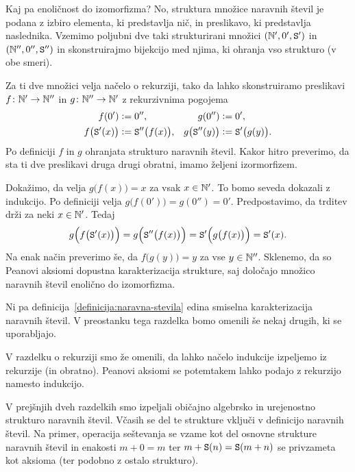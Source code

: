 Kaj pa enoličnost do izomorfizma? No, struktura množice naravnih števil je podana z izbiro elementa, ki predstavlja nič, in preslikavo, ki predstavlja naslednika. Vzemimo poljubni dve taki strukturirani množici $(\mathbb{N}', 0', \mathtt{S}')$ in $(\mathbb{N}'', 0'', \mathtt{S}'')$ in skonstruirajmo bijekcijo med njima, ki ohranja vso strukturo (v obe smeri).

Za ti dve množici velja načelo o rekurziji, tako da lahko skonstruiramo preslikavi $f\colon \mathbb{N}' \to \mathbb{N}''$ in $g\colon \mathbb{N}'' \to \mathbb{N}'$ z rekurzivnima pogojema
\begin{align*}
f(0') &\mathrel{\mathop:}= 0'', & g(0'') &\mathrel{\mathop:}= 0', \\
f\big(\mathtt{S}'(x)\big) &\mathrel{\mathop:}= \mathtt{S}''\big(f(x)\big), & g\big(\mathtt{S}''(y)\big) &\mathrel{\mathop:}= \mathtt{S}'\big(g(y)\big).
\end{align*}
Po definiciji $f$ in $g$ ohranjata strukturo naravnih števil. Kakor hitro preverimo, da sta ti dve preslikavi druga drugi obratni, imamo željeni izormorfizem.

Dokažimo, da velja $g\big(f(x)\big) = x$ za vsak $x \in \mathbb{N}'$. To bomo seveda dokazali z indukcijo. Po definiciji velja $g\big(f(0')\big) = g(0'') = 0'$. Predpostavimo, da trditev drži za neki $x \in \mathbb{N}'$. Tedaj
\[g\Big(f\big(\mathtt{S}'(x)\big)\Big) = g\Big(\mathtt{S}''\big(f(x)\big)\Big) = \mathtt{S}'\Big(g\big(f(x)\big)\Big) = \mathtt{S}'(x).\]
Na enak način preverimo še, da $f\big(g(y)\big) = y$ za vse $y \in \mathbb{N}''$. Sklenemo, da so Peanovi aksiomi dopustna karakterizacija strukture, saj določajo množico naravnih števil enolično do izomorfizma.

Ni pa definicija~\ref{definicija:naravna-stevila} edina smiselna karakterizacija naravnih števil. V preostanku tega razdelka bomo omenili še nekaj drugih, ki se uporabljajo.

V razdelku o rekurziji smo že omenili, da lahko načelo indukcije izpeljemo iz rekurzije (in obratno). Peanovi aksiomi se potemtakem lahko podajo z rekurzijo namesto indukcijo.

V prejšnjih dveh razdelkih smo izpeljali običajno algebrsko in urejenostno strukturo naravnih števil. Včasih se del te strukture vključi v definicijo naravnih števil. Na primer, operacija seštevanja se vzame kot del osnovne strukture naravnih števil in enakosti $m + 0 = m$ ter $m + \mathtt{S}(n) = \mathtt{S}(m + n)$ se privzameta kot aksioma (ter podobno z ostalo strukturo).



